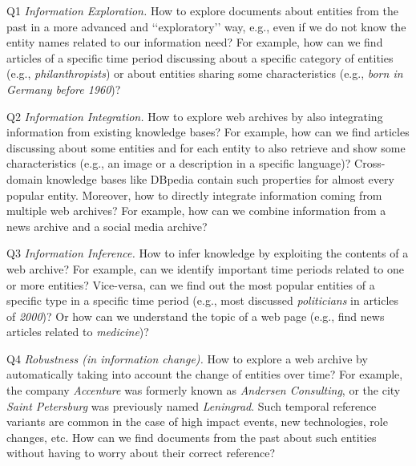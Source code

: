 \documentclass{libtex/sig-alternate-05-2015}
\newcommand{\q}[1]{\lq\lq{}{}#1\rq\rq{}{}}
\begin{document}
\begin{compactitem}
\item[Q1]   {\em Information Exploration.}
            How to explore documents about entities from the past in a
            more advanced and \q{exploratory} way,
            e.g., even if we do not know the entity names
            related to our information need?
            For example, how can we find articles of a specific time period
            discussing about a specific category of entities (e.g., {\em philanthropists})
            or about entities sharing some characteristics (e.g., {\em born in Germany before 1960})?
\item[Q2]   {\em Information Integration.}
            How to explore web archives by also integrating
            information from existing kno\-wledge bases?
            For example, how can we find articles discussing about
            some entities and for each entity to also retrieve
            and show some characteristics (e.g., an image or a description in a specific language)?
            Cross-domain knowledge bases like DBpedia contain such properties for almost every popular entity.
            Moreover, how to directly integrate information coming from
            multiple web archives?
            For example, how can we combine information
            from a news archive and a social media archive?
\item[Q3]   {\em Information Inference.}
            How to infer knowledge by exploiting the contents of a web archive? For example,
            can we identify important time periods related to one or more entities?
            Vice-versa, can we find out the most popular entities of a specific type
            in a specific time period (e.g., most discussed {\em politicians} in articles of {\em 2000})?
            Or how can we understand the topic of a web page (e.g., find news articles related to {\em medicine})?
\item[Q4]   {\em Robustness (in information change).} How to explore a web archive by automatically taking into account the change
            of entities over time? For example, the company {\em Accenture} was formerly known
            as {\em Andersen Consulting}, or
            the city {\em Saint Petersburg} was previously named {\em Leningrad}.
            Such temporal reference variants are common in the case of high impact events,
            new technologies, role changes, etc. How can we find
            documents from the past about such entities without having to worry about their correct reference?

\end{compactitem}
\end{document}
